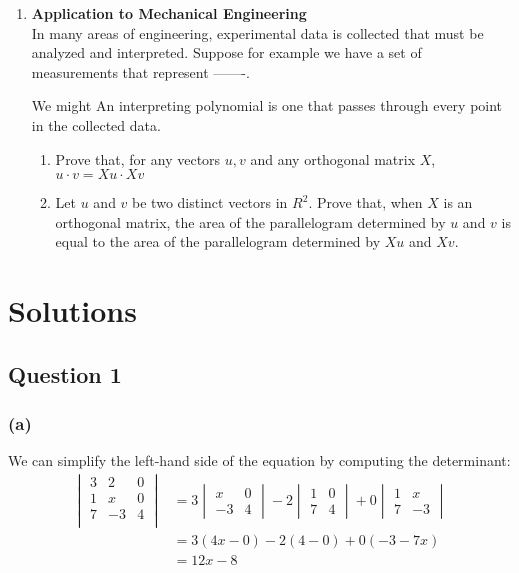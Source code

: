 \documentclass{article}
\begin{document}
\begin{enumerate}
\item 
\textbf{Application to Mechanical Engineering}\\
In many areas of engineering, experimental data is collected that must be analyzed and interpreted. Suppose for example we have a set of measurements that represent -------. 


We might 
An interpreting polynomial is one that passes through every point in the collected data. 
\begin{enumerate}
\item Prove that, for any vectors $u, v$ and any orthogonal matrix $X$, $u 
\cdot v = Xu \cdot Xv$
\item Let $u$ and $v$ be two distinct vectors in $R^{2}$.  Prove that, when 
$X$ is an orthogonal matrix, the area of the parallelogram determined by $u$ 
and $v$ is equal to the area of the parallelogram determined by $Xu$ and 
$Xv$.
\end{enumerate}


\end{enumerate}


\newpage
\section*{Solutions}

\subsection*{Question 1}

\subsubsection*{(a)}
We can simplify the left-hand side of the equation by computing the
determinant:
\begin{align*}
  \begin{vmatrix}
   3 &  2 &  0 \\
   1 &  x &  0 \\
   7 & -3 &  4 \\
  \end{vmatrix}
 &=
  3 \begin{vmatrix} x & 0 \\ -3 & 4 \end{vmatrix} -
  2 \begin{vmatrix} 1 & 0 \\ 7 & 4 \end{vmatrix} +
  0 \begin{vmatrix} 1 & x \\ 7 & -3 \end{vmatrix} \\
 &=
  3(4x - 0) - 2(4 - 0) + 0(-3 -7x) \\
 &=
  12x - 8
\end{align*}
\end{document}
